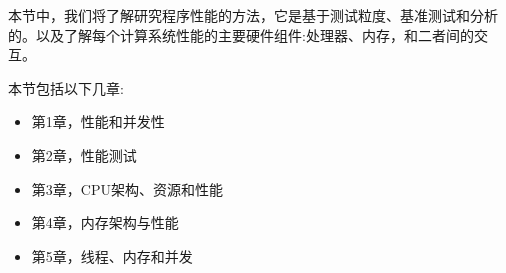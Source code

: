 本节中，我们将了解研究程序性能的方法，它是基于测试粒度、基准测试和分析的。以及了解每个计算系统性能的主要硬件组件:处理器、内存，和二者间的交互。

本节包括以下几章:

\begin{itemize}
\item 第1章，性能和并发性
\item 第2章，性能测试
\item 第3章，CPU架构、资源和性能
\item 第4章，内存架构与性能
\item 第5章，线程、内存和并发
\end{itemize}